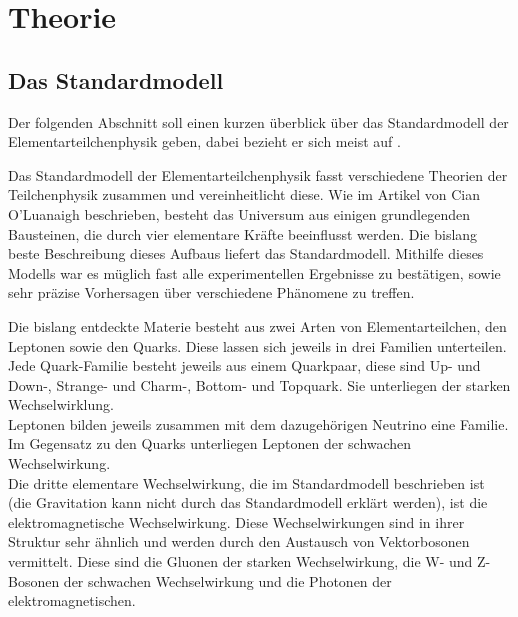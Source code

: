 \chapter{Theorie}
\label{ch:Theorie}



\section{Das Standardmodell}
\label{ch:Theorie:sec:Standardmodell}

Der folgenden Abschnitt soll einen kurzen \"uberblick \"uber das Standardmodell der Elementarteilchenphysik geben, dabei bezieht er sich meist auf \cite{SWB-39819646X}.

Das Standardmodell der Elementarteilchenphysik fasst verschiedene Theorien der Teilchenphysik zusammen und vereinheitlicht diese. Wie im Artikel von Cian O'Luanaigh \cite{O'Luanaigh:1997201} beschrieben, besteht das Universum aus einigen grundlegenden Bausteinen, die durch vier elementare Kr\"afte beeinflusst werden. Die bislang beste Beschreibung dieses Aufbaus liefert das Standardmodell. Mithilfe dieses Modells war es m\"uglich fast alle experimentellen Ergebnisse zu best\"atigen, sowie sehr pr\"azise Vorhersagen \"uber verschiedene Ph\"anomene zu treffen.

Die bislang entdeckte Materie besteht aus zwei Arten von Elementarteilchen, den Leptonen sowie den Quarks. Diese lassen sich jeweils in drei Familien unterteilen. Jede Quark-Familie besteht jeweils aus einem Quarkpaar, diese sind Up- und Down-, Strange- und Charm-, Bottom- und Topquark. Sie unterliegen der starken Wechselwirklung.\\
Leptonen bilden jeweils zusammen mit dem dazugeh\"origen Neutrino eine Familie. Im Gegensatz zu den Quarks unterliegen Leptonen der schwachen Wechselwirkung.\\
Die dritte elementare Wechselwirkung, die im Standardmodell beschrieben ist (die Gravitation kann nicht durch das Standardmodell erkl\"art werden), ist die elektromagnetische Wechselwirkung. Diese Wechselwirkungen sind in ihrer Struktur sehr \"ahnlich und werden durch den Austausch von Vektorbosonen vermittelt. Diese sind die Gluonen der starken Wechselwirkung, die W- und Z-Bosonen der schwachen Wechselwirkung und die Photonen der elektromagnetischen. 


